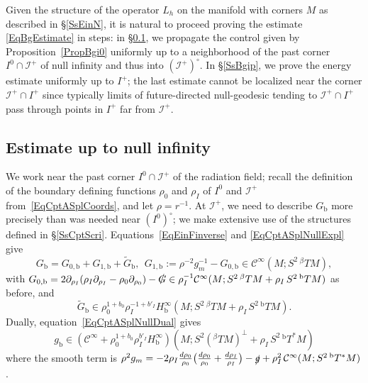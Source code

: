 \documentclass[reqno,11pt,letterpaper]{amsart}
\numberwithin{equation}{section}
\numberwithin{figure}{section}
\theoremstyle{definition}
\theoremstyle{remark}
\newcommand{\mc}{\mathcal}
\newcommand{\cC}{\mc C}
\newcommand{\ms}{\mathscr}
\newcommand{\scri}{\ms I}
\newcommand{\slg}{\slashed{g}{}}
\newcommand{\slG}{\slashed{G}{}}
\newcommand{\pa}{\partial}
\newcommand{\wt}{\widetilde}
\newcommand{\bop}{{\mathrm{b}}}
\newcommand{\Tb}{{}^{\bop}T}
\newcommand{\Tbeta}{{}^{\beta}T}
\newcommand{\CI}{\cC^\infty}
\newcommand{\Hb}{H_{\bop}}
\begin{document}
Given the structure of the operator $L_h$ on the manifold with corners $M$ as described in \S\ref{SsEinN}, it is natural to proceed proving the estimate \eqref{EqBgEstimate} in steps: in \S\ref{SsBgscri}, we propagate the control given by Proposition~\ref{PropBgi0} uniformly up to a neighborhood of the past corner $I^0\cap\scri^+$ of null infinity and thus into $(\scri^+)^\circ$. In \S\ref{SsBgip}, we prove the energy estimate uniformly up to $I^+$; the last estimate cannot be localized near the corner $\scri^+\cap I^+$ since typically limits of future-directed null-geodesic tending to $\scri^+\cap I^+$ pass through points in $I^+$ far from $\scri^+$.




\subsection{Estimate up to null infinity}
\label{SsBgscri}

We work near the past corner $I^0\cap\scri^+$ of the radiation field; recall the definition of the boundary defining functions $\rho_0$ and $\rho_I$ of $I^0$ and $\scri^+$ from~\eqref{EqCptASplCoords}, and let $\rho=r^{-1}$. At $\scri^+$, we need to describe $G_\bop$ more precisely than was needed near $(I^0)^\circ$; we make extensive use of the structures defined in \S\ref{SsCptScri}. Equations~\eqref{EqEinFinverse} and \eqref{EqCptASplNullExpl} give
\begin{equation}
\label{EqBgscriGb}
  G_\bop = G_{0,\bop} + G_{1,\bop} + \wt G_\bop,\ \ 
  G_{1,\bop}:=\rho^{-2}g_m^{-1}-G_{0,\bop}\in\CI(M;S^2\,\Tbeta M),
\end{equation}
with $G_{0,\bop}=2\pa_{\rho_I}(\rho_I\pa_{\rho_I}-\rho_0\pa_{\rho_0})-\slG\in \rho_I^{-1}\CI(M;S^2\,\Tbeta M+\rho_I\,S^2\,\Tb M)$ as before, and
\[
  \wt G_\bop \in \rho_0^{1+b_0}\rho_I^{-1+b'_I}\Hb^\infty(M;S^2\,\Tbeta M+\rho_I\,S^2\,\Tb M).
\]
Dually, equation~\eqref{EqCptASplNullDual} gives
\begin{equation}
\label{EqBgscrig0Space}
  g_\bop \in (\CI+\rho_0^{1+b_0}\rho_I^{b'_I}\Hb^\infty)(M;S^2(\Tbeta M)^\perp + \rho_I\,S^2\,\Tb^*M)
\end{equation}
where the smooth term is $\rho^2 g_m=-2\rho_I\tfrac{d\rho_0}{\rho_0}\bigl(\tfrac{d\rho_0}{\rho_0}+\tfrac{d\rho_I}{\rho_I}\bigr) - \slg + \rho_I^2\,\CI(M;S^2\,\Tb^*M)$.
\end{document}
